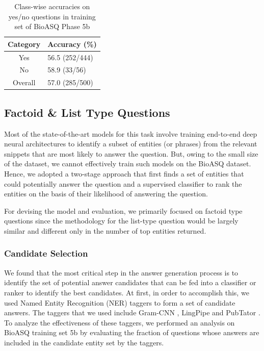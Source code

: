 \documentclass[11pt,a4paper]{article}
\begin{document}
\begin{table}[t!]
    \centering
    \begin{tabular}{c|l} \hline
    
    Category & Accuracy (\%) \\ \hline
    Yes      &  56.5  (252/444)\\
    No       &  58.9 (33/56) \\
    Overall  &  57.0 (285/500) \\      \hline
    \end{tabular}
    \caption{Class-wise accuracies on yes/no questions in training set of BioASQ Phase 5b}
    \label{tab:yesno_results}
\end{table}

\subsection{Factoid \& List Type Questions}

Most of the state-of-the-art models for this task involve training end-to-end deep neural architectures to identify a subset of entities (or phrases) from the relevant snippets that are most likely to answer the question. But, owing to the small size of the dataset, we cannot effectively train such models on the BioASQ dataset. Hence, we adopted a two-stage approach that first finds a set  of entities that could potentially answer the question and a supervised classifier to rank the entities on the basis of their likelihood of answering the question.

For devising the model and evaluation, we primarily focused on factoid type questions since the methodology for the list-type question would be largely similar and different only in the number of top entities returned. 

\subsubsection{Candidate Selection}

We found that the most critical step in the answer generation process is to identify the set of potential answer candidates that can be fed into a classifier or ranker to identify the best candidates. At first, in order to accomplish this, we used Named Entity Recognition (NER) taggers to form a set of candidate answers. The taggers that we used include Gram-CNN \cite{gram-cnn}, LingPipe\cite{lingpipe} and PubTator \cite{pubtator}. To analyze the effectiveness of these taggers, we performed an analysis on BioASQ training set 5b by evaluating the fraction of questions whose answers are included in the candidate entity set by the taggers.
\end{document}
